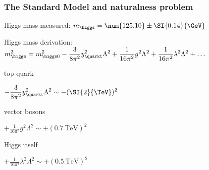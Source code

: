 \begin{frame}
\frametitle{The Standard Model and naturalness problem}

\manip Higgs mass measured: $m_{\higgs} = \num{125.10} \pm \SI{0.14}{\GeV}$

\manip Higgs mass derivation:
$\displaystyle
m_{\higgs}^2 = m_{\higgs 0}^2 -\frac{3}{8\pi^2} y_{\quarkt}^2 \Lambda^2  +\frac{1}{16\pi^2} g^2 \Lambda^2 + \frac{1}{16\pi^2} \lambda^2 \Lambda^2 + \ldots
$

\begin{minipage}[t]{.3\textwidth}
\begin{block}{top quark}
\begin{center}
\vspace{-4.5pt}

\vspace{-4.5pt}

$\displaystyle -\frac{3}{8\pi^2} y_{\quarkt}^2 \Lambda^2 \sim -(\SI{2}{\TeV})^2$
\end{center}
\end{block}
\end{minipage}
\hfill
\begin{minipage}[t]{.3\textwidth}
\begin{block}{vector bosons}
\begin{center}

\vspace{-9pt}

$\displaystyle +\frac{1}{16\pi^2} g^2 \Lambda^2 \sim +(\SI{0.7}{\TeV})^2$
\end{center}
\end{block}
\end{minipage}
\hfill
\begin{minipage}[t]{.3\textwidth}
\begin{block}{Higgs itself}
\begin{center}

\vspace{-9pt}

$\displaystyle + \frac{1}{16\pi^2} \lambda^2 \Lambda^2 \sim +(\SI{0.5}{\TeV})^2$
\end{center}
\end{block}
\end{minipage}

\end{frame}

